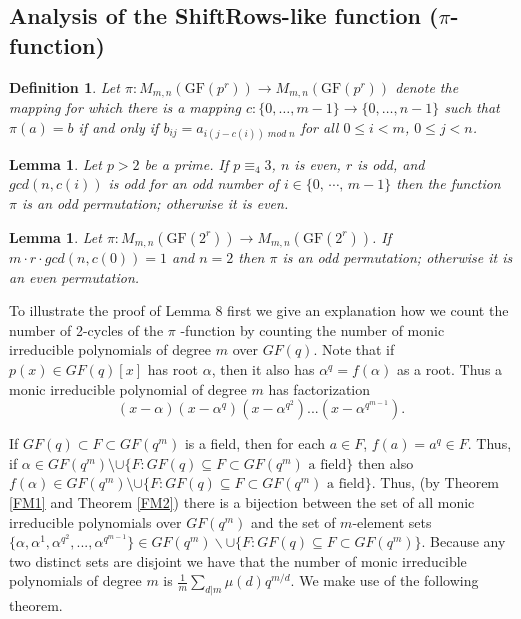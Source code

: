 \documentclass[11pt]{amsart}
\newcommand{\GF}{\mathrm{GF}}
\newtheorem{definition}{{\bf Definition}}
\newtheorem{lemma}[theorem]{{\bf Lemma }}
\begin{document}
\subsection{{\bf Analysis of the ShiftRows-like function} ($\pi$-function)}
\begin{definition} 
Let $\pi: M_{m,n}(\GF(p^r))\rightarrow M_{m,n}(\GF(p^r))$ denote the mapping for which there is a mapping $c: \{0,\ldots, m-1\}\rightarrow \{0,\ldots, n-1\}$ such that $\pi(a)=b$ if and only if $b_{ij}=a_{i(j-c(i))\;mod\;n}$ for all $0\leq i <m$, $0\leq j <n$.  
\end{definition}


\begin{lemma}\label{SRlemma} Let $p>2$ be a prime.  If  $p\equiv_4 3$,  $n$ is even, $r$ is odd, and $gcd(n,c(i))$ is odd for an odd number of $i\in\{0,\,\cdots,\,m-1\}$ then the function  $\pi$ is an odd permutation; otherwise it is even. 
\end{lemma}

\begin{lemma}\label{2isp} 
Let $\pi: M_{m,n}(\GF(2^r))\rightarrow M_{m,n}(\GF(2^r))$. If $m\cdot r\cdot gcd(n,c(0))=1$ and $n=2$ then $\pi$ is an odd permutation; otherwise it is an even permutation.
\end{lemma}




To illustrate the proof of Lemma 8 first we give an explanation how we count the number of 2-cycles of the $\pi$ -function by counting the number of monic irreducible polynomials of degree $m$ over $GF(q)$. Note that if $p(x)\in GF(q)[x]$ has root $\alpha$, then it also has $\alpha^q = f(\alpha)$ as a root. Thus a monic irreducible polynomial of degree $m$ has factorization
$$ (x - \alpha)(x - \alpha^{q})(x - \alpha^{q^2}) ...(x-\alpha^{q^{m-1}}).$$ %

If $GF(q) \subset F\subset GF(q^m)$ is a field, then for each $a \in F$, $f(a) = a^q \in F$. Thus, if $\alpha \in GF(q^m)\setminus \cup \lbrace F: GF(q) \subseteq F\subset GF(q^m) \mbox{ a field} \rbrace$ then also $\displaystyle {f(\alpha) \in GF(q^m)\setminus \cup \lbrace F: GF(q) \subseteq F \subset GF(q^m) \mbox{ a field}\rbrace}$. Thus, (by Theorem \ref{FM1} and Theorem \ref{FM2}) there is a bijection between the set of all monic irreducible polynomials over $GF(q^m)$ and the set of $m$-element sets $\lbrace\alpha, \alpha^1, \alpha ^{q^2}, ..., \alpha^{q^{m-1}}\rbrace \in GF(q^m)\smallsetminus \cup \lbrace F: GF(q)\subseteq F \subset GF(q^m)\rbrace$.
Because any two distinct sets are disjoint we have that the number of monic irreducible polynomials of degree $m$ is $\displaystyle \frac{1}{m} \sum_{d|m} \mu(d) q ^{m/d}$. We make use of the following theorem.
\end{document}
